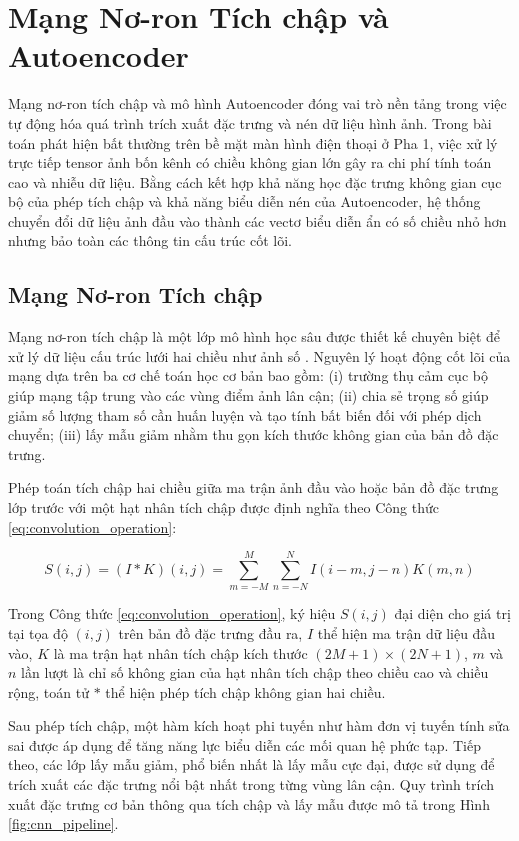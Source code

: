 \section{Mạng Nơ-ron Tích chập và Autoencoder}

Mạng nơ-ron tích chập và mô hình Autoencoder đóng vai trò nền tảng trong việc tự động hóa quá trình trích xuất đặc trưng và nén dữ liệu hình ảnh. Trong bài toán phát hiện bất thường trên bề mặt màn hình điện thoại ở Pha 1, việc xử lý trực tiếp tensor ảnh bốn kênh có chiều không gian lớn gây ra chi phí tính toán cao và nhiễu dữ liệu. Bằng cách kết hợp khả năng học đặc trưng không gian cục bộ của phép tích chập và khả năng biểu diễn nén của Autoencoder, hệ thống chuyển đổi dữ liệu ảnh đầu vào thành các vectơ biểu diễn ẩn có số chiều nhỏ hơn nhưng bảo toàn các thông tin cấu trúc cốt lõi.

\subsection{Mạng Nơ-ron Tích chập}

Mạng nơ-ron tích chập là một lớp mô hình học sâu được thiết kế chuyên biệt để xử lý dữ liệu cấu trúc lưới hai chiều như ảnh số \cite{lecanu2015deep}. Nguyên lý hoạt động cốt lõi của mạng dựa trên ba cơ chế toán học cơ bản bao gồm: (i) trường thụ cảm cục bộ giúp mạng tập trung vào các vùng điểm ảnh lân cận; (ii) chia sẻ trọng số giúp giảm số lượng tham số cần huấn luyện và tạo tính bất biến đối với phép dịch chuyển; (iii) lấy mẫu giảm nhằm thu gọn kích thước không gian của bản đồ đặc trưng.

Phép toán tích chập hai chiều giữa ma trận ảnh đầu vào hoặc bản đồ đặc trưng lớp trước với một hạt nhân tích chập được định nghĩa theo Công thức \ref{eq:convolution_operation}:

\begin{equation}
S(i,j) = (I * K)(i,j) = \sum_{m=-M}^{M} \sum_{n=-N}^{N} I(i-m, j-n) K(m,n)
\label{eq:convolution_operation}
\end{equation}

Trong Công thức \ref{eq:convolution_operation}, ký hiệu $S(i,j)$ đại diện cho giá trị tại tọa độ $(i,j)$ trên bản đồ đặc trưng đầu ra, $I$ thể hiện ma trận dữ liệu đầu vào, $K$ là ma trận hạt nhân tích chập kích thước $(2M+1) \times (2N+1)$, $m$ và $n$ lần lượt là chỉ số không gian của hạt nhân tích chập theo chiều cao và chiều rộng, toán tử $*$ thể hiện phép tích chập không gian hai chiều.

Sau phép tích chập, một hàm kích hoạt phi tuyến như hàm đơn vị tuyến tính sửa sai được áp dụng để tăng năng lực biểu diễn các mối quan hệ phức tạp. Tiếp theo, các lớp lấy mẫu giảm, phổ biến nhất là lấy mẫu cực đại, được sử dụng để trích xuất các đặc trưng nổi bật nhất trong từng vùng lân cận. Quy trình trích xuất đặc trưng cơ bản thông qua tích chập và lấy mẫu được mô tả trong Hình \ref{fig:cnn_pipeline}.

